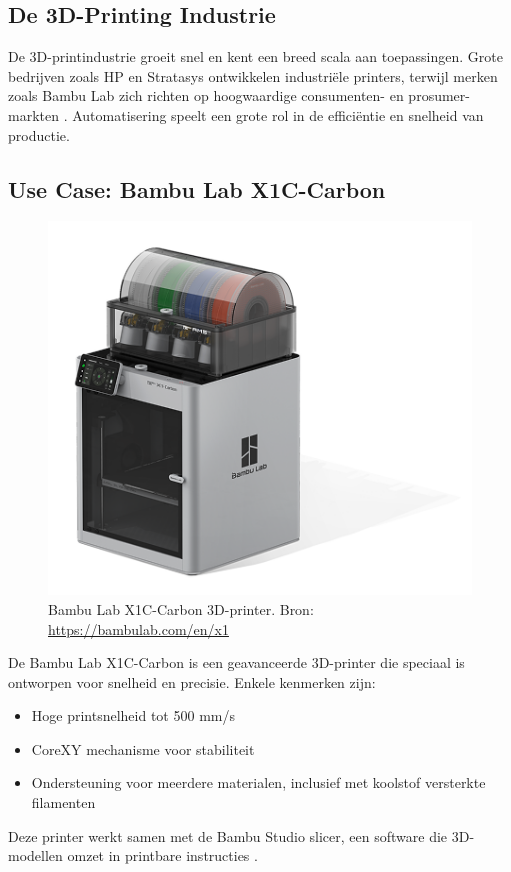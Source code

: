 \newpage
\subsection{De 3D-Printing Industrie}
De 3D-printindustrie groeit snel en kent een breed scala aan toepassingen. Grote bedrijven zoals HP en Stratasys ontwikkelen industriële printers, terwijl merken zoals Bambu Lab zich richten op hoogwaardige consumenten- en prosumer-markten \autocite{3dPrintingIndustry}. Automatisering speelt een grote rol in de efficiëntie en snelheid van productie.

\subsection{Use Case: Bambu Lab X1C-Carbon}
\begin{figure} %
    \centering
    \includegraphics[width=0.8\linewidth]{Foto's/X1C}
    \caption{Bambu Lab X1C-Carbon 3D-printer. Bron: \url{https://bambulab.com/en/x1}}
    \label{fig:x1c}
\end{figure}
De Bambu Lab X1C-Carbon is een geavanceerde 3D-printer die speciaal is ontworpen voor snelheid en precisie. Enkele kenmerken zijn:
\begin{itemize}
    \item Hoge printsnelheid tot 500 mm/s
    \item CoreXY mechanisme voor stabiliteit
    \item Ondersteuning voor meerdere materialen, inclusief met koolstof versterkte filamenten
\end{itemize}
Deze printer werkt samen met de Bambu Studio slicer, een software die 3D-modellen omzet in printbare instructies \autocite{bambulabX1Carbon}.




